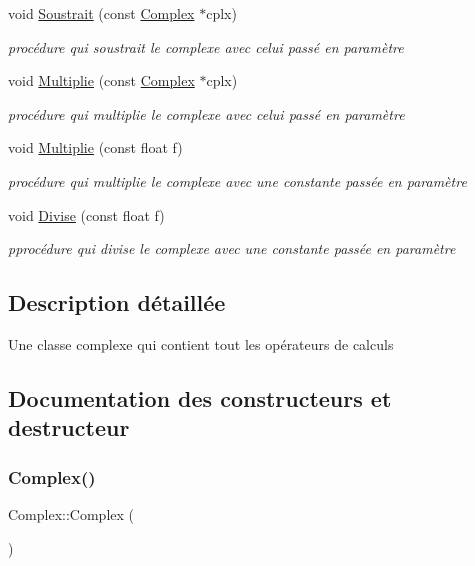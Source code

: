 \begin{DoxyCompactItemize}
void \hyperlink{classComplex_aa5227decd635b6042c7a7d4bba253042}{Soustrait} (const \hyperlink{classComplex}{Complex} $\ast$cplx)
\begin{DoxyCompactList}\small\item\em procédure qui soustrait le complexe avec celui passé en paramètre \end{DoxyCompactList}\item 
void \hyperlink{classComplex_ae2d874e5fd18af604d6b1429b2b252b1}{Multiplie} (const \hyperlink{classComplex}{Complex} $\ast$cplx)
\begin{DoxyCompactList}\small\item\em procédure qui multiplie le complexe avec celui passé en paramètre \end{DoxyCompactList}\item 
void \hyperlink{classComplex_ac1cf09bfb20040d2b7bd135e40f51929}{Multiplie} (const float f)
\begin{DoxyCompactList}\small\item\em procédure qui multiplie le complexe avec une constante passée en paramètre \end{DoxyCompactList}\item 
void \hyperlink{classComplex_a63ad91cacff2e8156d32243ace56c66b}{Divise} (const float f)
\begin{DoxyCompactList}\small\item\em pprocédure qui divise le complexe avec une constante passée en paramètre \end{DoxyCompactList}\end{DoxyCompactItemize}


\subsection{Description détaillée}
Une classe complexe qui contient tout les opérateurs de calculs 

\subsection{Documentation des constructeurs et destructeur}
\mbox{\label{classComplex_a43b9f07cdf697c71b5fd506a6cc80b8f}} 
\subsubsection{\texorpdfstring{Complex()}{Complex()}\hspace{0.1cm}{\footnotesize\ttfamily [1/2]}}
{\footnotesize\ttfamily Complex\+::\+Complex (\begin{DoxyParamCaption}{ }\end{DoxyParamCaption})}



